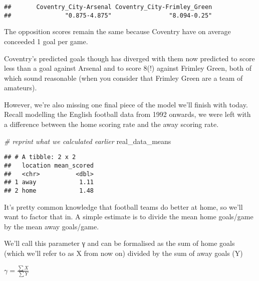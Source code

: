 \documentclass[]{article}
\newenvironment{Shaded}{\begin{snugshade}}{\end{snugshade}}
\newcommand{\CommentTok}[1]{\textcolor[rgb]{0.56,0.35,0.01}{\textit{#1}}}
\newcommand{\NormalTok}[1]{#1}
\begin{document}
\begin{verbatim}
##       Coventry_City-Arsenal Coventry_City-Frimley_Green 
##               "0.875-4.875"                "8.094-0.25"
\end{verbatim}

The opposition scores remain the same because Coventry have on average
conceeded 1 goal per game.

Coventry's predicted goals though has diverged with them now predicted
to score less than a goal against Arsenal and to score 8(!) against
Frimley Green, both of which sound reasonable (when you consider that
Frimley Green are a team of amateurs).

However, we're also missing one final piece of the model we'll finish
with today. Recall modelling the English football data from 1992
onwards, we were left with a difference between the home scoring rate
and the away scoring rate.

\begin{Shaded}
\begin{Highlighting}[]
\CommentTok{# reprint what we calculated earlier}
\NormalTok{real_data_means}
\end{Highlighting}
\end{Shaded}

\begin{verbatim}
## # A tibble: 2 x 2
##   location mean_scored
##   <chr>          <dbl>
## 1 away            1.11
## 2 home            1.48
\end{verbatim}

It's pretty common knowledge that football teams do better at home, so
we'll want to factor that in. A simple estimate is to divide the mean
home goals/game by the mean away goals/game.

We'll call this parameter γ and can be formalised as the sum of home
goals (which we'll refer to as X from now on) divided by the sum of away
goals (Y)

\(\gamma = \frac{\sum{X}}{\sum{Y}}\)
\end{document}
